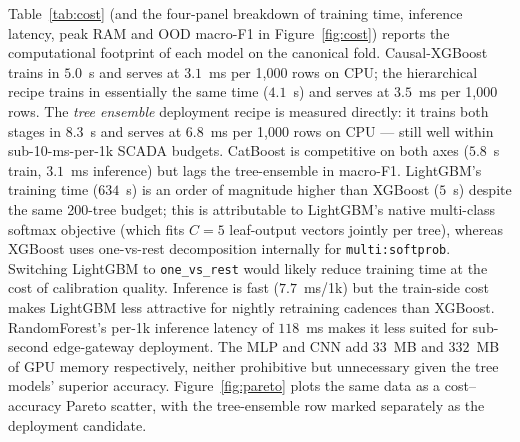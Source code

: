 \documentclass[3p,times,authoryear]{elsarticle}
\theoremstyle{remark}
\begin{document}
Table~\ref{tab:cost} (and the four-panel breakdown of training
time, inference latency, peak RAM and OOD macro-F1 in
Figure~\ref{fig:cost}) reports the computational footprint of
each model on the canonical fold. Causal-XGBoost trains in
$5.0$~s and serves at $3.1$~ms per 1{,}000 rows on CPU; the
hierarchical recipe trains in essentially the same time
($4.1$~s) and serves at $3.5$~ms per 1{,}000 rows. The
\emph{tree ensemble} deployment recipe is measured directly: it
trains both stages in $8.3$~s and serves at $6.8$~ms per 1{,}000
rows on CPU --- still well within sub-10-ms-per-1k SCADA budgets.
CatBoost is competitive on both axes ($5.8$~s train, $3.1$~ms
inference) but lags the tree-ensemble in macro-F1.
LightGBM's training time ($634$~s) is an order of magnitude
higher than XGBoost ($5$~s) despite the same 200-tree budget;
this is attributable to LightGBM's native multi-class softmax
objective (which fits $C{=}5$ leaf-output vectors jointly per
tree), whereas XGBoost uses one-vs-rest decomposition internally
for \texttt{multi:softprob}. Switching LightGBM to
\texttt{one\_vs\_rest} would likely reduce training time at the
cost of calibration quality. Inference is fast ($7.7$~ms/1k)
but the train-side cost makes LightGBM less attractive for
nightly retraining cadences than XGBoost. RandomForest's per-1k inference latency of $118$~ms
makes it less suited for sub-second edge-gateway deployment.
The MLP and CNN add $33$~MB and $332$~MB of GPU memory
respectively, neither prohibitive but unnecessary given the
tree models' superior accuracy. Figure~\ref{fig:pareto} plots
the same data as a cost--accuracy Pareto scatter, with the
tree-ensemble row marked separately as the deployment
candidate.
\end{document}
